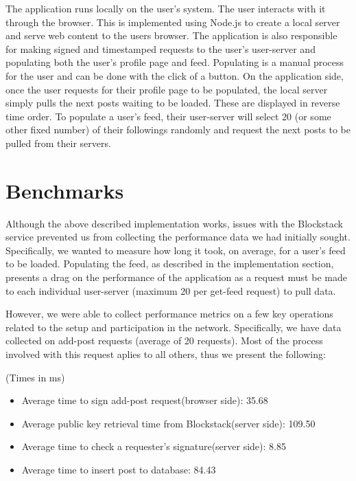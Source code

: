 \documentclass[pageno]{jpaper}
\begin{document}
\begin{multicols*}{2}
The application runs locally on the user's system. The user interacts with it through the browser. This is implemented using Node.js to create a local server and serve web content to the users browser. The application is also responsible for making signed and timestamped requests to the user's user-server and populating both the user's profile page and feed. Populating is a manual process for the user and can be done with the click of a button. On the application side, once the user requests for their profile page to be populated, the local server simply pulls the next posts waiting to be loaded. These are displayed in reverse time order. To populate a user's feed, their user-server will select 20 (or some other fixed number) of their followings randomly and request the next posts to be pulled from their servers.

\section{Benchmarks}
\label{section:benchmarks}

Although the above described implementation works, issues with the Blockstack service prevented us from collecting the performance data we had initially sought. Specifically, we wanted to measure how long it took, on average, for a user's feed to be loaded. Populating the feed, as described in the implementation section, presents a drag on the performance of the application as a request must be made to each individual user-server (maximum 20 per get-feed request) to pull data.\par
However, we were able to collect performance metrics on a few key operations related to the setup and participation in the network. Specifically, we have data collected on add-post requests (average of 20 requests). Most of the process involved with this request aplies to all others, thus we present the following:

\begin{center}
	(Times in ms)
	\begin{itemize}
		\setlength{\itemsep}{2\baselineskip}
		\item Average time to sign add-post request(browser side): 35.68
		\item Average public key retrieval time from Blockstack(server side): 109.50
		\item Average time to check a requester's signature(server side): 8.85
		\item Average time to insert post to database: 84.43
	\end{itemize}
\end{center}


\end{multicols*}
\end{document}
